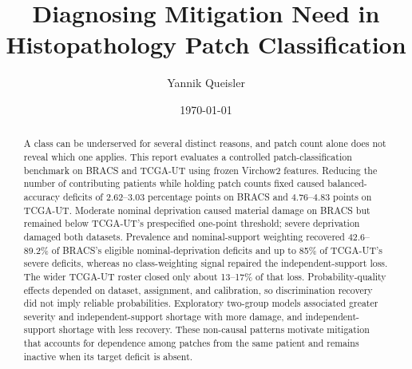 \documentclass[11pt]{article}
\title{Diagnosing Mitigation Need in Histopathology Patch Classification}
\author{Yannik Queisler}
\date{\today}
\begin{document}
\raggedbottom
\setlength{\emergencystretch}{2em}
\hypersetup{pageanchor=false}
\begin{titlepage}
\centering
\vspace*{\fill}
\makeatletter
{\LARGE\bfseries \@title\par}
\vspace{1.5em}
{\large \@author\par}
\vspace{1.5em}
{\large \@date\par}
\makeatother

\begin{abstract}
\begingroup
\setlength{\emergencystretch}{2em}
\noindent A class can be underserved for several distinct reasons, and patch count alone does not reveal which one applies. This report evaluates a controlled patch-classification benchmark on BRACS and TCGA-UT using frozen Virchow2 features. Reducing the number of contributing patients while holding patch counts fixed caused balanced-accuracy deficits of \num{2.62}--\num{3.03} percentage points on BRACS and \num{4.76}--\num{4.83} points on TCGA-UT. Moderate nominal deprivation caused material damage on BRACS but remained below TCGA-UT's prespecified one-point threshold; severe deprivation damaged both datasets. Prevalence and nominal-support weighting recovered \num{42.6}--\num{89.2}\% of BRACS's eligible nominal-deprivation deficits and up to \num{85}\% of TCGA-UT's severe deficits, whereas no class-weighting signal repaired the independent-support loss. The wider TCGA-UT roster closed only about \num{13}--\num{17}\% of that loss. Probability-quality effects depended on dataset, assignment, and calibration, so discrimination recovery did not imply reliable probabilities. Exploratory two-group models associated greater severity and independent-support shortage with more damage, and independent-support shortage with less recovery. These non-causal patterns motivate mitigation that accounts for dependence among patches from the same patient and remains inactive when its target deficit is absent.
\par
\endgroup
\end{abstract}
\vspace*{\fill}
\end{titlepage}
\hypersetup{pageanchor=true}

\setcounter{tocdepth}{2}
\tableofcontents

\clearpage
\end{document}
